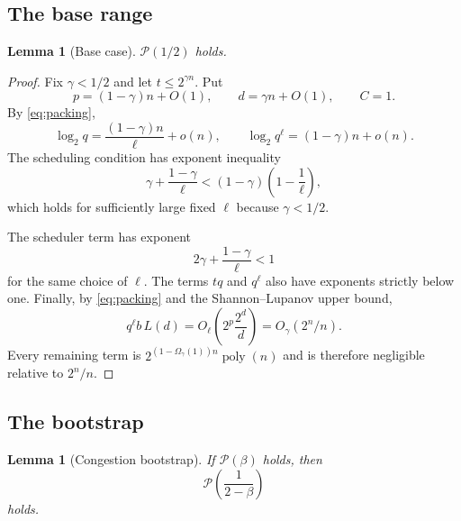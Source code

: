 \documentclass[11pt]{article}
\newtheorem{lemma}[theorem]{Lemma}
\theoremstyle{definition}
\newcommand{\poly}{\operatorname{poly}}
\begin{document}
\subsection{The base range}

\begin{lemma}[Base case]\label{lem:base}
$\mathcal P(1/2)$ holds.
\end{lemma}

\begin{proof}
Fix $\gamma<1/2$ and let $t\le2^{\gamma n}$.  Put
\[
 p=(1-\gamma)n+O(1),\qquad d=\gamma n+O(1),\qquad C=1.
\]
By \cref{eq:packing},
\[
 \log_2 q=\frac{(1-\gamma)n}{\ell}+o(n),
 \qquad
 \log_2 q^\ell=(1-\gamma)n+o(n).
\]
The scheduling condition has exponent inequality
\[
 \gamma+\frac{1-\gamma}{\ell}
 <(1-\gamma)\left(1-\frac1\ell\right),
\]
which holds for sufficiently large fixed $\ell$ because $\gamma<1/2$.

The scheduler term has exponent
\[
 2\gamma+\frac{1-\gamma}{\ell}<1
\]
for the same choice of $\ell$.  The terms $tq$ and $q^\ell$ also have exponents strictly below one.  Finally, by \cref{eq:packing} and the Shannon--Lupanov upper bound,
\[
 q^\ell b\,L(d)
 =O_\ell\!\left(2^p\frac{2^d}{d}\right)
 =O_\gamma(2^n/n).
\]
Every remaining term is $2^{(1-\Omega_\gamma(1))n}\poly(n)$ and is therefore negligible relative to $2^n/n$.
\end{proof}

\subsection{The bootstrap}

\begin{lemma}[Congestion bootstrap]\label{lem:bootstrap}
If $\mathcal P(\beta)$ holds, then
\[
 \mathcal P\!\left(\frac{1}{2-\beta}\right)
\]
holds.
\end{lemma}
\end{document}
